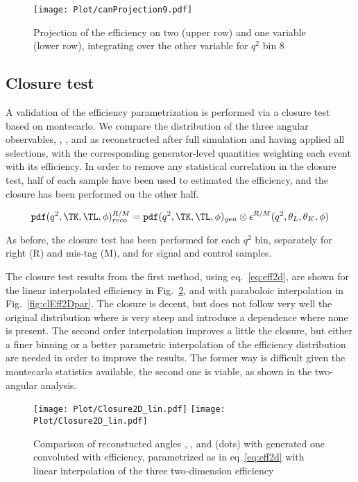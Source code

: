 \begin{figure}[hbt]
    \texttt{[image: Plot/canProjection9.pdf]}
    \caption{Projection of the efficiency on two (upper row) and one variable (lower row), integrating over the other variable for $q^2$ bin 8}
    \label{fig:effPro8}
\end{figure}

\clearpage

\subsection{Closure test}\label{sec:closure}

A validation of the efficiency parametrization is performed via a closure test
based on montecarlo.
We compare the distribution of the three angular
observables, \TK, \TL, and \PHI as reconstructed after full simulation and
having applied all selections, with the corresponding generator-level
quantities weighting each event with its efficiency.
In order to remove any statistical correlation in the closure test, half of
each sample have been used to estimated the efficiency, and the closure has
been performed on the other half.

\begin{equation}\label{eq:effClosure}
    \mathtt{pdf}(q^2,\TK,\TL,\phi)_{reco}^{R/M}=\mathtt{pdf}(q^2,\TK,\TL,\phi)_{gen}\otimes\epsilon^{R/M}(q^2,\theta_L,\theta_K,\phi)
\end{equation}

As before, the closure test has been performed for each $q^2$ bin, separately
for right (R) and mis-tag (M), and for signal and control samples.

The closure test results from the first method, using eq.~\ref{eq:eff2d}, are
shown for the linear interpolated efficiency in Fig.~\ref{fig:clEff2Dlin}, and
with paraboloic interpolation in Fig.~\ref{fig:clEff2Dpar}.
The closure is decent, but does not follow very well the original distribution
where is very steep and introduce a \PHI dependence where none is present.  The
second order interpolation improves a little the closure, but
either a finer binning or a better parametric interpolation of the efficiency
distribution are needed in order to improve the results. The former way is
difficult given the montecarlo statistics available, the second one is viable,
as shown in the two-angular analysis.

\begin{figure}[hbt]
    \texttt{[image: Plot/Closure2D\_lin.pdf]}
    \texttt{[image: Plot/Closure2D\_lin.pdf]}
    \caption{Comparison of reconstucted angles \TK, \TL, and \PHI (dots) with generated one convoluted with efficiency, parametrized as in eq~\ref{eq:eff2d} with linear interpolation of the three two-dimension efficiency}
    \label{fig:clEff2Dlin}
\end{figure}

